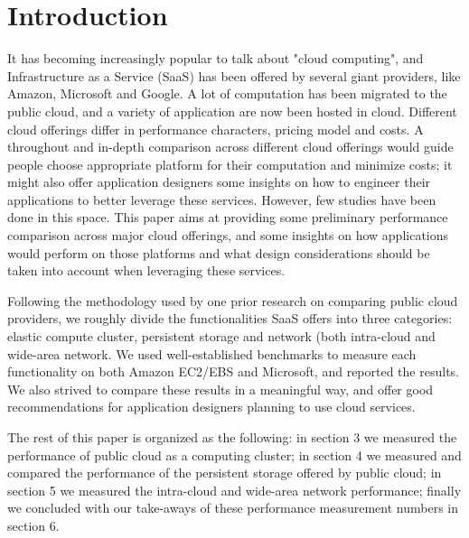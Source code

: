 \section{Introduction}
\label{section:intro}

It has becoming increasingly popular to talk about "cloud computing", and Infrastructure as a Service (SaaS) has been offered by several giant providers, like Amazon, Microsoft and Google. A lot of computation has been migrated to the public cloud, and a variety of application are now been hosted in cloud. Different cloud offerings differ in performance characters, pricing model and costs. A throughout and in-depth comparison across different cloud offerings would guide people choose appropriate platform for their computation and minimize costs; it might also offer application designers some insights on how to engineer their applications to better leverage these services. However, few studies have been done in this space. This paper aims at providing some preliminary performance comparison across major cloud offerings, and some insights on how applications would perform on those platforms and what design considerations should be taken into account when leveraging these services. 

Following the methodology used by one prior research on comparing public cloud providers, we roughly divide the functionalities SaaS offers into three categories: elastic compute cluster, persistent storage and network (both intra-cloud and wide-area network. We used well-established benchmarks to measure each functionality on both Amazon EC2/EBS and Microsoft, and reported the results. We also strived to compare these results in a meaningful way, and offer good recommendations for application designers planning to use cloud services. 

The rest of this paper is organized as the following: in section 3 we measured the performance of public cloud as a computing cluster; in section 4 we measured and compared the performance of the persistent storage offered by public cloud; in section 5 we measured the intra-cloud and wide-area network performance; finally we concluded with our take-aways of these performance measurement numbers in section 6.
